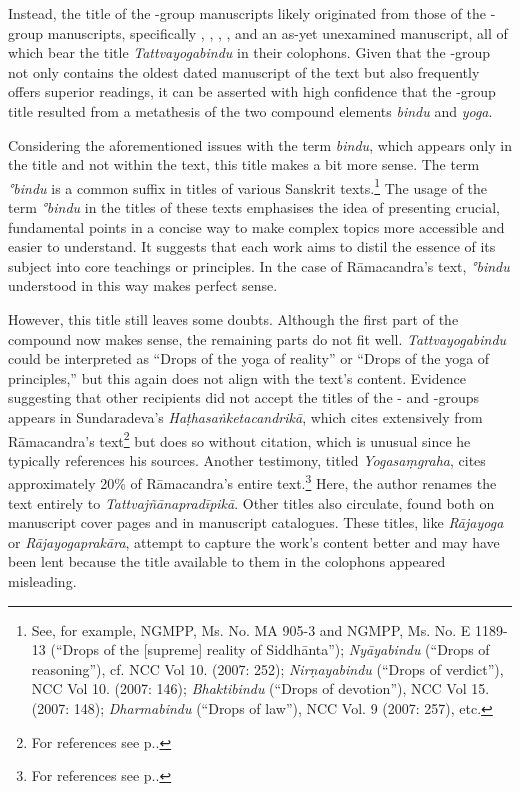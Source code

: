 Instead, the title of the \beta-group manuscripts likely originated from those of the \alpha-group manuscripts, specifically , , , , and an as-yet unexamined manuscript, all of which bear the title \emph{Tattvayogabindu} in their colophons. Given that the \alpha-group not only contains the oldest dated manuscript of the text but also frequently offers superior readings, it can be asserted with high confidence that the \beta-group title resulted from a metathesis of the two compound elements \textit{bindu} and \textit{yoga}.

Considering the aforementioned issues with the term \textit{bindu}, which appears only in the title and not within the text, this title makes a bit more sense. The term \textit{°bindu} is a common suffix in titles of various Sanskrit texts.\footnote{See, for example, \nocite{stb2} NGMPP, Ms. No. MA 905-3 and NGMPP, Ms. No. E 1189-13 (``Drops of the [supreme] reality of Siddhānta''); \emph{Nyāyabindu} (``Drops of reasoning''), cf. \nocite{newcataloguscatalogorum10} NCC Vol 10. (2007: 252); \emph{Nirṇayabindu} (``Drops of verdict''), NCC Vol 10. (2007: 146); \emph{Bhaktibindu} (``Drops of devotion''), NCC Vol 15. (2007: 148); \emph{Dharmabindu} (``Drops of law''), NCC Vol. 9 (2007: 257), etc.\nocite{newcataloguscatalogorum9}\nocite{newcataloguscatalogorum15}} The usage of the term \textit{°bindu} in the titles of these texts emphasises the idea of presenting crucial, fundamental points in a concise way to make complex topics more accessible and easier to understand. It suggests that each work aims to distil the essence of its subject into core teachings or principles. In the case of Rāmacandra's text, \textit{°bindu} understood in this way makes perfect sense.     

However, this title still leaves some doubts. Although the first part of the compound now makes sense, the remaining parts do not fit well. \emph{Tattvayogabindu} could be interpreted as ``Drops of the yoga of reality'' or ``Drops of the yoga of principles,'' but this again does not align with the text's content. Evidence suggesting that other recipients did not accept the titles of the \alpha- and \beta-groups appears in Sundaradeva's \emph{Haṭhasaṅketacandrikā}, which cites extensively from Rāmacandra's text\footnote{For references see p.\pageref{hathacandrika}.} but does so without citation, which is unusual since he typically references his sources. Another testimony, titled \emph{Yogasaṃgraha}, cites approximately 20\% of Rāmacandra's entire text.\footnote{For references see p.\pageref{yogasamgraha}.} Here, the author renames the text entirely to \emph{Tattvajñānapradīpikā}. Other titles also circulate, found both on manuscript cover pages and in manuscript catalogues. These titles, like \emph{Rājayoga} or \emph{Rājayogaprakāra}, attempt to capture the work's content better and may have been lent because the title available to them in the colophons appeared misleading. 

